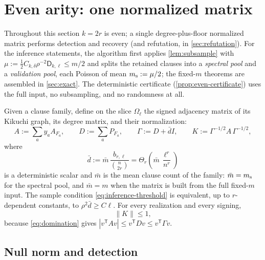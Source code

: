 \documentclass[11pt]{article}
\theoremstyle{definition}
\theoremstyle{remark}
\newcommand{\1}{\mathbf 1}
\newcommand{\bd}{\bar d}
\newcommand{\Dkl}{\mathsf D_{k,\ell}}
\numberwithin{equation}{section}
\begin{document}
\section{Even arity: one normalized matrix}\label{sec:even}

Throughout this section $k=2r$ is even; a single degree-plus-floor
normalized matrix performs detection and recovery (and refutation, in
\cref{sec:refutation}).  For the inference statements, the algorithm
first applies \cref{lem:subsample} with
$\mu:=\tfrac12C_{k,\delta}\rho^{-2}\Dkl\le m/2$ and splits the
retained clauses into a \emph{spectral pool} and a \emph{validation
pool}, each Poisson of mean $m_{\rm s}:=\mu/2$; the fixed-$m$ theorems
are assembled in \cref{sec:exact}.  The deterministic certificate
(\cref{prop:even-certificate}) uses the full input, no subsampling, and
no randomness at all.

Given a clause family, define on the slice $\Omega_\ell$ the signed
adjacency matrix of its Kikuchi graph, its degree matrix, and their
normalization:
\begin{equation}\label{eq:even-operator}
 A:=\sum_{a}y_aA_{F_a},
 \qquad
 D:=\sum_{a}P_{F_a},
 \qquad
 \Gamma:=D+\bd I,
 \qquad
 K:=\Gamma^{-1/2}A\,\Gamma^{-1/2},
\end{equation}
where
\begin{equation}\label{eq:even-mean-degree}
 \bd:=\bar m\,\frac{b_{r,\ell}}{\binom n{2r}}
 =\Theta_r\!\left(\bar m\,\frac{\ell^r}{n^r}\right)
\end{equation}
is a deterministic scalar and $\bar m$ is the mean clause count of the
family: $\bar m=m_{\rm s}$ for the spectral pool, and $\bar m=m$ when the
matrix is built from the full fixed-$m$ input.  The sample condition
\cref{eq:inference-threshold} is equivalent, up to $r$-dependent
constants, to $\rho^2\bd\ge C\ell$.  For every realization and every
signing,
\begin{equation}\label{eq:even-contraction}
 \|K\|\le1,
\end{equation}
because \cref{eq:domination} gives
$|v^{\mathsf T}Av|\le v^{\mathsf T}Dv\le v^{\mathsf T}\Gamma v$.

\subsection{Null norm and detection}
\end{document}
